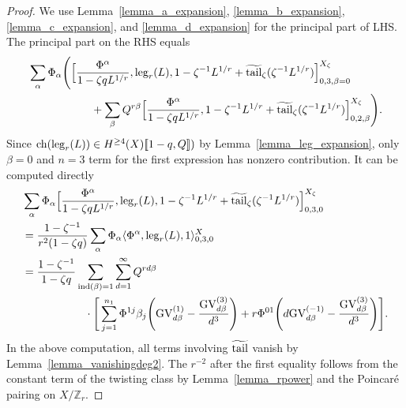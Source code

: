 \documentclass[11pt]{amsart}
\newtheorem*{main theorem*}{Main Theorem}
\theoremstyle{remark}
\numberwithin{equation}{section}
\newcommand{\ch}{{\rm ch}}
\newcommand{\leg}{{\rm leg}}
\newcommand{\tail}{{\rm tail}}
\newcommand{\GV}{{\mathrm{GV}}}
\newcommand{\ind}{{\mathrm{ind}}}
\begin{document}
\begin{proof}
We use Lemma~\ref{lemma_a_expansion}, \ref{lemma_b_expansion}, \ref{lemma_c_expansion}, and \ref{lemma_d_expansion} for the principal part of LHS. The principal part on the RHS equals
\[
\begin{split}
    &\sum_{\alpha} \Phi_{\alpha} \Bigg( \Big[ \frac{\Phi^{\alpha}}{1-\zeta qL^{1/r} }, \leg_r(L), 1-\zeta^{-1}L^{1/r} + \widetilde{\tail}_{\zeta}(\zeta^{-1}L^{1/r})\Big]^{X_{\zeta}}_{0,3,\beta=0}
    \\
    & \hspace{20mm} + \sum_{\beta} Q^{r\beta}\Big[ \frac{\Phi^{\alpha}}{1-\zeta q L^{1/r}}, 1-\zeta^{-1} L^{1/r} + \widetilde{\tail}_{\zeta}(\zeta^{-1}L^{1/r})\Big]^{X_{\zeta}}_{0,2,\beta} \Bigg). 
\end{split}
\]
Since $\ch(\leg_r(L)) \in H^{\geq 4}(X)[\![1-q,Q]\!])$ by Lemma~\ref{lemma_leg_expansion}, only $\beta=0$ and $n=3$ term for the first expression has nonzero contribution. It can be computed directly
\begin{equation} \label{eqn_t=0_leg}
\begin{split}
    &\sum_{\alpha} \Phi_{\alpha} \Big[ \frac{\Phi^{\alpha}}{1-\zeta qL^{1/r}}, \leg_r(L), 1-\zeta^{-1}L^{1/r} + \widetilde{\tail}_{\zeta}(\zeta^{-1}L^{1/r})\Big]^{X_{\zeta}}_{0,3,0}
    \\
    &= \frac{1-\zeta^{-1}}{r^2(1 - \zeta q)} \sum_{\alpha} \Phi_{\alpha}\langle \Phi^{\alpha}, \leg_r(L), 1 \rangle^X_{0,3,0}
    \\
    & = \frac{1-\zeta^{-1}}{1-\zeta q}\sum_{\ind(\beta)=1}\sum_{d=1}^{\infty} Q^{rd\beta} 
    \\
    & \hspace{20mm} \cdot\Bigg[ \sum_{j=1}^{n_1}  \Phi^{1j} \beta_j \Bigg( \GV_{d\beta}^{(1)} - \frac{\GV_{d\beta}^{(3)}}{d^3} \Bigg) + r\Phi^{01} \Bigg( d\GV_{d\beta}^{(-1)} - \frac{\GV_{d\beta}^{(3)}}{d^3}  \Bigg) \Bigg].
\end{split}
\end{equation}
In the above computation, all terms involving $\widetilde{\tail}$ vanish by Lemma~\ref{lemma_vanishingdeg2}.
The $r^{-2}$ after the first equality follows from the constant term of the twisting class by Lemma~\ref{lemma_rpower} and the Poincar\'e pairing on $X/ \mathbb{Z}_r$. 


\end{proof}
\end{document}
